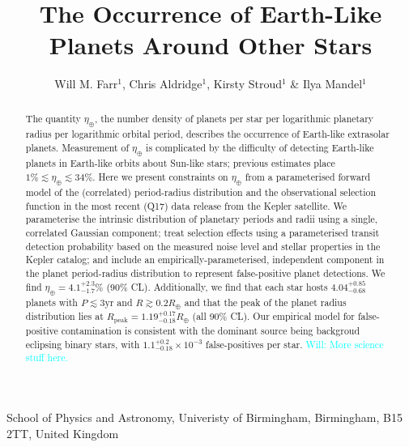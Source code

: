 \documentclass{nature}
\newcommand{\etaearth}{\eta_\oplus}
\newcommand{\Rpeak}{R_\mathrm{peak}}
\newcommand{\REarth}{R_\oplus}
\newcommand{\Will}[1]{\textcolor{cyan}{Will: #1}}
\begin{document}
\title{The Occurrence of Earth-Like Planets Around Other Stars}

\author{Will M. Farr$^{1}$, Chris Aldridge$^{1}$, Kirsty Stroud$^{1}$ \& Ilya Mandel$^{1}$}

\maketitle

\begin{affiliations}
\item School of Physics and Astronomy, Univeristy of Birmingham, Birmingham, B15 2TT, United Kingdom
\end{affiliations}

\begin{abstract}
  The quantity $\etaearth$, the number density of planets per star per
  logarithmic planetary radius per logarithmic orbital period,
  describes the occurrence of Earth-like extrasolar planets.
  Measurement of $\etaearth$ is complicated by the difficulty of
  detecting Earth-like planets in Earth-like orbits about Sun-like
  stars; previous
  estimates\cite{2011ApJ...738...81W,2011ApJ...738..151C,2012ApJ...745...20T,2013ApJ...778...53D,2013PNAS..11019273P}
  place $1\% \lesssim \etaearth \lesssim 34\%$.  Here we present
  constraints on $\etaearth$ from a parameterised forward model of the
  (correlated) period-radius distribution and the observational
  selection function in the most recent (Q17) data release from the
  Kepler
  satellite\cite{2010Sci...327..977B,2011ApJ...736...19B,2013ApJS..204...24B}.
  We parameterise the intrinsic distribution of planetary periods and
  radii using a single, correlated Gaussian component; treat selection
  effects using a parameterised transit detection probability based on
  the measured noise level and stellar properties in the Kepler
  catalog; and include an empirically-parameterised, independent
  component in the planet period-radius distribution to represent
  false-positive planet detections.  We find $\etaearth =
  4.1^{+2.3}_{-1.7}\%$ (90\% CL).  Additionally, we find that each
  star hosts $4.04_{-0.68}^{+0.85}$ planets with $P \lesssim 3
  \mathrm{yr}$ and $R \gtrsim 0.2 \REarth$ and that the peak of the
  planet radius distribution lies at $\Rpeak = 1.19_{-0.18}^{+0.17}
  \REarth$ (all 90\% CL).  Our empirical model for false-positive
  contamination is consistent with the dominant source being backgroud
  eclipsing binary stars, with $1.1_{-0.18}^{+0.2} \times 10^{-3}$
  false-positives per star.  \Will{More science stuff here.}
\end{abstract}
\end{document}
